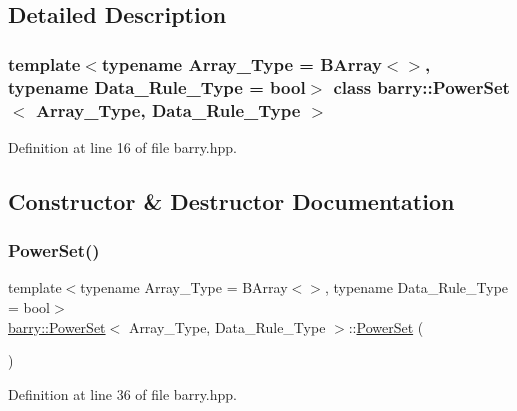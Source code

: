 \subsection{Detailed Description}
\subsubsection*{template$<$typename Array\+\_\+\+Type = B\+Array$<$$>$, typename Data\+\_\+\+Rule\+\_\+\+Type = bool$>$\newline
class barry\+::\+Power\+Set$<$ Array\+\_\+\+Type, Data\+\_\+\+Rule\+\_\+\+Type $>$}



Definition at line 16 of file barry.\+hpp.



\subsection{Constructor \& Destructor Documentation}
\mbox{\label{classbarry_1_1_power_set_ab2fa4e40323bb9225225bb52b86ff345}} 
\subsubsection{\texorpdfstring{Power\+Set()}{PowerSet()}\hspace{0.1cm}{\footnotesize\ttfamily [1/2]}}
{\footnotesize\ttfamily template$<$typename Array\+\_\+\+Type  = B\+Array$<$$>$, typename Data\+\_\+\+Rule\+\_\+\+Type  = bool$>$ \\
\hyperlink{classbarry_1_1_power_set}{barry\+::\+Power\+Set}$<$ Array\+\_\+\+Type, Data\+\_\+\+Rule\+\_\+\+Type $>$\+::\hyperlink{classbarry_1_1_power_set}{Power\+Set} (\begin{DoxyParamCaption}{ }\end{DoxyParamCaption})\hspace{0.3cm}{\ttfamily [inline]}}



Definition at line 36 of file barry.\+hpp.

\mbox{\label{classbarry_1_1_power_set_a96a31964644ea81991fe103a2a8bfb1f}} 
